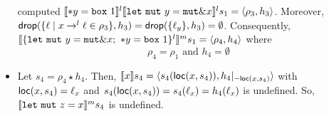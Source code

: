 \begin{example}
\begin{itemize}
    computed $\denl[\mathtt{*}y = \mathtt{box}\ 1]{l}{
    \denl[\mathtt{let\ mut}\ y = \mathtt{mut}\borrow x]{l}{s_1}} =
    \langle\rho_3,h_3\rangle$. Moreover,
    $\drop(\{\ell\mid x\to^l\ell\in\rho_3\},h_3) = \drop(\{\ell_y\},h_3) =
    \emptyset$. Consequently,
    $\denl[\{\mathtt{let\ mut}\ y = \mathtt{mut}\borrow x;\
    \mathtt{*}y = \mathtt{box}\ 1\}^l]{m}{s_1} =
    \langle \rho_4,h_4\rangle$ where
    \[\rho_4 = \rho_1 \text{ and } h_4 = \emptyset\]
    \item Let $s_4 = \rho_4 \star h_4$. Then,
    $\den[x]{s_4} =
    \langle s_4(\loc(x,s_4)), {h_4}|_{-\loc(x,s_4)}\rangle$
    with $\loc(x,s_4)=\ell_x$ and $s_4(\loc(x,s_4)) = s_4(\ell_x)
    = h_4(\ell_x)$ is undefined. So,
    $\denl[\mathtt{let\ mut}\ z = x]{m}{s_4}$ is undefined.
  \end{itemize}
\end{example}
